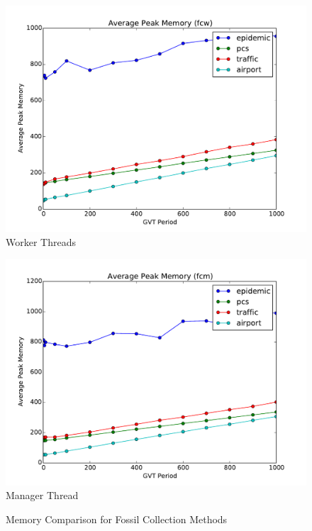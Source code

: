 \documentclass[11pt]{book}
\begin{document}
\begin{figure}
  \begin{minipage}{.5\textwidth}
    \begin{center}
      \includegraphics[width=\textwidth,keepaspectratio]{figs/fossil_collection/memory_fcw.pdf} \\
      Worker Threads \\
    \end{center}
  \end{minipage} \hfill
  \begin{minipage}{.5\textwidth}
    \begin{center}
      \includegraphics[width=\textwidth,keepaspectratio]{figs/fossil_collection/memory_fcm.pdf} \\
      Manager Thread \\
    \end{center}
  \end{minipage}
  \caption{Memory Comparison for Fossil Collection Methods}\label{fc_memory_analysis}
\end{figure}
\end{document}
